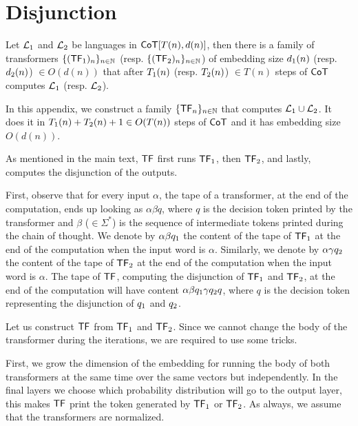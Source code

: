 \section{Disjunction}\label{appendix:det-or}

Let ${\mathcal{L}}_1$ and  ${\mathcal{L}}_2$ be languages in $\mathsf{CoT}[T(n), d(n)]$, then there is a family of transformers $\{({\mathsf{TF}}_1)_n\}_{n \in \mathbb{N}}$ (resp. $\{({\mathsf{TF}}_2)_n\}_{n \in \mathbb{N}}$) of embedding size ${d}_1(n)$ (resp. ${d}_2(n)$) $\in O(d(n))$ that after ${T}_1(n)$ (resp. ${T}_2(n)$) $\in T(n)$ steps of $\mathsf{CoT}$ computes ${\mathcal{L}}_1$ (resp. ${\mathcal{L}}_2$).

In this appendix, we construct a family $\{\mathsf{TF}_n\}_{n \in \mathbb{N}}$ that computes ${\mathcal{L}}_1 \cup {\mathcal{L}}_2$.
It does it in ${T}_1(n) + {T}_2(n) + 1 \in O(T(n))$ steps of $\mathsf{CoT}$ and it has embedding size $O(d(n))$.

As mentioned in the  main text, $\mathsf{TF}$ first runs ${\mathsf{TF}}_1$, then ${\mathsf{TF}}_2$, and lastly, computes the disjunction of the outputs.

\medskip
First, observe that for every input $\alpha$, the tape of a transformer, at the end of the computation, ends up looking as $\alpha \beta q$, where $q$ is the decision token printed by the transformer and $\beta$ ($\in \Sigma^*$) is the sequence of intermediate tokens printed during the chain of thought.
We denote by $\alpha \beta {q}_1$ the content of the tape of ${\mathsf{TF}}_1$ at the end of the computation when the input word is $\alpha$.
Similarly, we denote by $\alpha \gamma {q}_2$ the content of the tape of ${\mathsf{TF}}_2$ at the end of the computation when the input word is $\alpha$.
The tape of $\mathsf{TF}$, computing the disjunction of ${\mathsf{TF}}_1$ and ${\mathsf{TF}}_2$, at the end of the computation will have content $\alpha \beta {q}_1 \gamma {q}_2 q$, where $q$ is the decision token representing the disjunction of ${q}_1$ and ${q}_2$.


\medskip

Let us construct $\mathsf{TF}$ from ${\mathsf{TF}}_1$ and ${\mathsf{TF}}_2$.
Since we cannot change the body of the transformer during the iterations, we are required to use some tricks.

First, we grow the dimension of the embedding for running the body of both transformers at the same time over the same vectors but independently.
In the final layers we choose which probability distribution will go to the output layer, this makes $\mathsf{TF}$ print the token generated by ${\mathsf{TF}}_1$ or ${\mathsf{TF}}_2$.
As always, we assume that the transformers are normalized.

